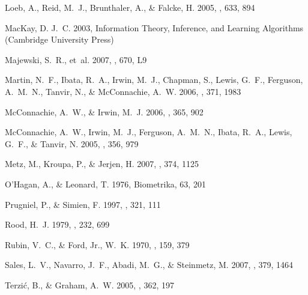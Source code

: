 \documentclass[preprint]{aastex}
\begin{document}
\begin{thebibliography}{}
{Loeb}, A., {Reid}, M.~J., {Brunthaler}, A., \& {Falcke}, H. 2005, \apj, 633,
  894

{MacKay}, D. J.~C. 2003, Information Theory, Inference, and Learning Algorithms
  (Cambridge University Press)

{Majewski}, S.~R., {et~al.} 2007, \apjl, 670, L9

{Martin}, N.~F., {Ibata}, R.~A., {Irwin}, M.~J., {Chapman}, S., {Lewis}, G.~F.,
  {Ferguson}, A.~M.~N., {Tanvir}, N., \& {McConnachie}, A.~W. 2006, \mnras,
  371, 1983

{McConnachie}, A.~W., \& {Irwin}, M.~J. 2006, \mnras, 365, 902

{McConnachie}, A.~W., {Irwin}, M.~J., {Ferguson}, A.~M.~N., {Ibata}, R.~A.,
  {Lewis}, G.~F., \& {Tanvir}, N. 2005, \mnras, 356, 979

{Metz}, M., {Kroupa}, P., \& {Jerjen}, H. 2007, \mnras, 374, 1125

O'Hagan, A., \& Leonard, T. 1976, Biometrika, 63, 201

{Prugniel}, P., \& {Simien}, F. 1997, \aap, 321, 111

{Rood}, H.~J. 1979, \apj, 232, 699

{Rubin}, V.~C., \& {Ford}, Jr., W.~K. 1970, \apj, 159, 379

{Sales}, L.~V., {Navarro}, J.~F., {Abadi}, M.~G., \& {Steinmetz}, M. 2007,
  \mnras, 379, 1464

{Terzi{\'c}}, B., \& {Graham}, A.~W. 2005, \mnras, 362, 197


\end{thebibliography}
\end{document}
